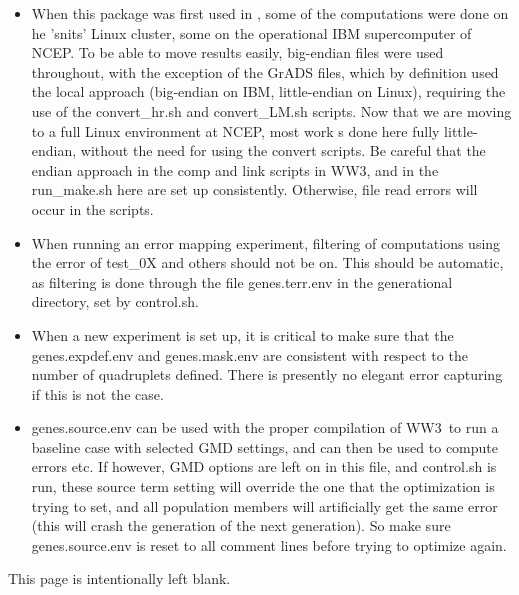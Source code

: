 \documentclass[12pt]{article}
\newcommand{\ws}{WW3}
\newcommand{\file}{\sf}
\newcommand{\pb}{\strut \vfill \pagebreak}
\newcommand{\bpagea}{\strut

\vspace{2.5in} \centerline{This page is intentionally left blank.}}
\begin{document}
\begin{itemize}

\item When this package was first used in \citep{tol:MMAB10d}, some of the
  computations were done on he 'snits' Linux cluster, some on the operational
  IBM supercomputer of NCEP. To be able to move results easily, big-endian
  files were used throughout, with the exception of the GrADS files, which by
  definition used the local approach (big-endian on IBM, little-endian on
  Linux), requiring the use of the {\file convert\_hr.sh} and {\file
    convert\_LM.sh } scripts. Now that we are moving to a full Linux
  environment at NCEP, most work s done here fully little-endian, without the
  need for using the convert scripts. Be careful that the endian approach in
  the {\file comp} and {\file link} scripts in \ws, and in the {\file
    run\_make.sh} here are set up consistently. Otherwise, file read errors
  will occur in the scripts.

\item When running an error mapping experiment, filtering of computations
  using the error of {\file test\_0X} and others should not be on. This should
  be automatic, as filtering is done through the file {\file genes.terr.env}
  in the generational directory, set by {\file control.sh}.

\item When a new experiment is set up, it is critical to make sure that the
  {\file genes.expdef.env} and {\file genes.mask.env} are consistent with
  respect to the number of quadruplets defined. There is presently no elegant
  error capturing if this is not the case. 

\item {\file genes.source.env} can be used with the proper compilation of \ws\
  to run a baseline case with selected GMD settings, and can then be used to
  compute errors etc. If however, GMD options are left on in this file, and
  {\file control.sh} is run, these source term setting will override the one
  that the optimization is trying to set, and all population members will
  artificially get the same error (this will crash the generation of the next
  generation). So make sure {\file genes.source.env} is reset to all comment
  lines before trying to optimize again.
\end{itemize}

\pb
\pagestyle{empty}
\bpagea
\end{document}
